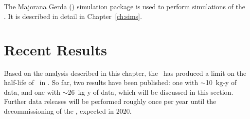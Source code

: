 \documentclass[/main.tex]{subfiles}
\begin{document}
\subsection{\Mage}
The Majorana Gerda (\Mage) simulation package is used to perform simulations of the \MJD\cite{mage2011}.
It is described in detail in Chapter~\ref{ch:sims}.

\section{Recent Results}
Based on the analysis described in this chapter, the \MJD\ has produced a limit on the half-life of \znbb\ in .
So far, two results have been published: one with ${\sim}$10~kg-y of data\cite{mjd2018}, and one with ${\sim}$26~kg-y of data\cite{mjd2019}, which will be discussed in this section.
Further data releases will be performed roughly once per year until the decommissioning of the \MJD, expected in 2020.
\end{document}
